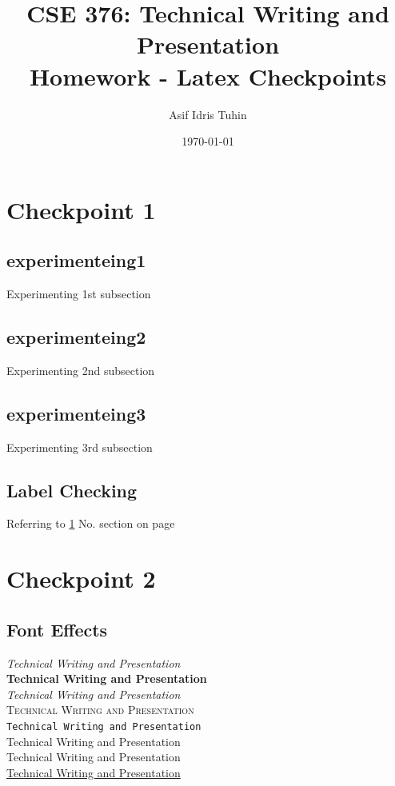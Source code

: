 \documentclass[a4paper,12pt]{article}
\begin{document}
\title{CSE 376: Technical Writing and Presentation\\Homework - Latex Checkpoints}
\author{Asif Idris Tuhin }
\date{\today}

\maketitle


\tableofcontents
\newpage
{}


\section{Checkpoint 1}
\label{checkpoint1}

\subsection{experimenteing1}
Experimenting 1st subsection
\subsection{experimenteing2}
Experimenting 2nd subsection
\subsection{experimenteing3}
Experimenting 3rd subsection
\subsection{Label Checking}
Referring to \ref{checkpoint1} No. section on page \pageref{checkpoint1}

\newpage
\section{Checkpoint 2}

\subsection{Font Effects}
\textit{Technical Writing and Presentation}\\
\textbf{Technical Writing and Presentation}\\
\textsl{Technical Writing and Presentation}\\
\textsc{Technical Writing and Presentation}\\
\texttt{Technical Writing and Presentation}\\
\textsf{Technical Writing and Presentation}\\
\textrm{Technical Writing and Presentation}\\
\underline{Technical Writing and Presentation}
\end{document}
